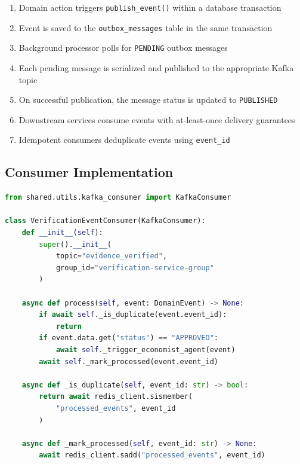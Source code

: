 \begin{enumerate}
  \item Domain action triggers \texttt{publish\_event()} within a database transaction
  \item Event is saved to the \texttt{outbox\_messages} table in the same transaction
  \item Background processor polls for \texttt{PENDING} outbox messages
  \item Each pending message is serialized and published to the appropriate Kafka topic
  \item On successful publication, the message status is updated to \texttt{PUBLISHED}
  \item Downstream services consume events with at-least-once delivery guarantees
  \item Idempotent consumers deduplicate events using \texttt{event\_id}
\end{enumerate}

\subsection{Consumer Implementation}

\begin{lstlisting}[language=Python, caption=Idempotent Kafka Consumer]
from shared.utils.kafka_consumer import KafkaConsumer

class VerificationEventConsumer(KafkaConsumer):
    def __init__(self):
        super().__init__(
            topic="evidence_verified",
            group_id="verification-service-group"
        )

    async def process(self, event: DomainEvent) -> None:
        if await self._is_duplicate(event.event_id):
            return
        if event.data.get("status") == "APPROVED":
            await self._trigger_economist_agent(event)
        await self._mark_processed(event.event_id)

    async def _is_duplicate(self, event_id: str) -> bool:
        return await redis_client.sismember(
            "processed_events", event_id
        )

    async def _mark_processed(self, event_id: str) -> None:
        await redis_client.sadd("processed_events", event_id)
\end{lstlisting}

\clearpage

